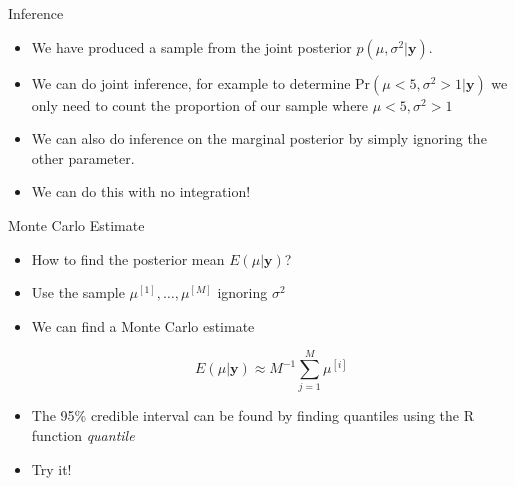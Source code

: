 \documentclass[10pt]{beamer}
\begin{document}
\begin{frame}{Inference}
  \begin{itemize}
  \item We have produced a sample from the joint posterior $p(\mu,\sigma^2|{\bm y})$.

  \item We can do joint inference, for example to determine $\mbox{Pr}(\mu<5,\sigma^2>1|{\bm y})$ we only need to count the proportion of our sample where $\mu<5,\sigma^2>1$

  \item We can also do inference on the marginal posterior by simply ignoring the other parameter.

  \item We can do this with no integration!
  \end{itemize}
\end{frame}
\begin{frame}{Monte Carlo Estimate}
  \begin{itemize}
  \item How to find the posterior mean $E(\mu|{\bm y})$?

  \item Use the sample $\mu^{[1]},\ldots,\mu^{[M]}$ ignoring $\sigma^2$

  \item We can find a Monte Carlo estimate

    \begin{equation}
      E(\mu|{\bm y})\approx M^{-1}\sum\limits_{j=1}^M \mu^{[i]}
    \end{equation}

  \item The 95\% credible interval can be found by finding quantiles using the R function {\em quantile}

  \item Try it!
  \end{itemize}
\end{frame}
\end{document}
